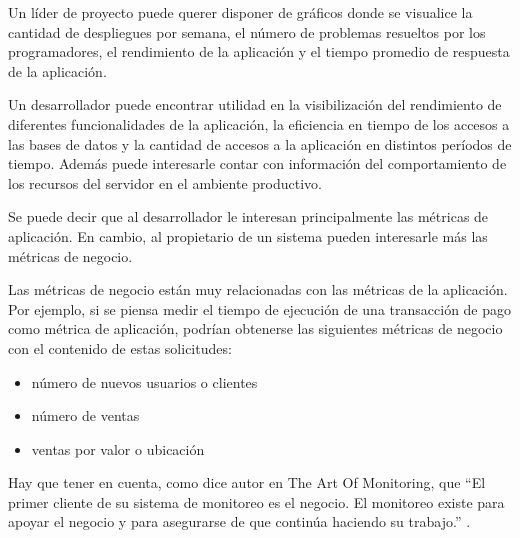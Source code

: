 Un líder de proyecto puede querer disponer de gráficos donde se visualice la
cantidad de despliegues por semana, el número de problemas resueltos por los
programadores, el rendimiento de la aplicación y el tiempo promedio de
respuesta de la aplicación.

Un desarrollador puede encontrar utilidad en la visibilización del rendimiento
de diferentes funcionalidades de la aplicación, la eficiencia en tiempo de los
accesos a las bases de datos y la cantidad de accesos a la aplicación en
distintos períodos de tiempo. Además puede interesarle contar con información
del comportamiento de los recursos del servidor en el ambiente productivo.

Se puede decir que al desarrollador le interesan principalmente las métricas de
aplicación. En cambio, al propietario de un sistema pueden interesarle más las
métricas de negocio.\cite[p.~446]{monitoreo:art_of_monitoring}

Las métricas de negocio están muy relacionadas con las métricas de la
aplicación. Por ejemplo, si se piensa medir el tiempo de ejecución de una
transacción de pago como métrica de aplicación, podrían obtenerse las siguientes
métricas de negocio con el contenido de estas solicitudes:

\begin{itemize}
  \item número de nuevos usuarios o clientes
  \item número de ventas
  \item ventas por valor o ubicación
\end{itemize}

Hay que tener en cuenta, como dice autor en The Art Of Monitoring, que “El
primer cliente de su sistema de monitoreo es el negocio. El monitoreo existe
para apoyar el negocio y para asegurarse de que continúa haciendo su trabajo.”
\cite[p.~8]{monitoreo:art_of_monitoring}.
